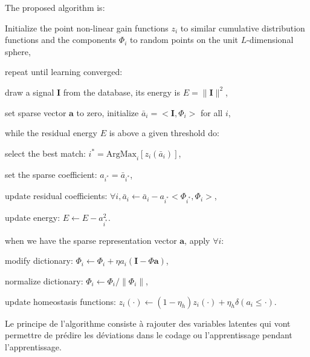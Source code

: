 \documentclass[a4paper, 11pt]{article} %
\newcommand{\coef}{\mathbf{a}} %
\newcommand{\image}{\mathbf{I}} %
\newcommand{\dico}{\Phi} %
\begin{document}
The proposed algorithm is:
\begin{enumerate}%
{\color{MidnightBlue} 
\item Initialize the point non-linear gain functions $z_i$ to similar cumulative distribution functions and the components $\dico_i$ to random points on the unit $L$-dimensional sphere,%
\item repeat until learning converged:%
\begin{enumerate}%
{\color{OliveGreen}
	\item draw a signal $\image$ from the database, its energy is $E = \| \image \|^2$,%
	\item set sparse vector $\coef$ to zero, initialize $\bar{a}_i=<\image, \dico_i >$ for all $i$,%
	\item while the residual energy $E$ is above a given threshold do:
	\begin{enumerate}
		{\color{BrickRed}
			\item select the best match: $i^\ast = \mbox{ArgMax}_{i} [z_i( \bar{a}_i )]$,%
		}
		\item set the sparse coefficient: $a_{i^\ast} = \bar{a}_{i^\ast}$,
		\item update residual coefficients: $\forall i, \bar{a}_i \leftarrow \bar{a}_i - a_{i^\ast} <\dico_{i^\ast} , \dico_i > $,%
		\item update energy: $E \leftarrow E - a_{i^\ast}^2 $.
	\end{enumerate}
}
\item when we have the sparse representation vector $\coef$, apply $\forall i$:
\begin{enumerate}
\item modify dictionary: $\dico_{i} \leftarrow \dico_{i} + \eta a_{i} (\image - \dico\coef)$,%
\item normalize dictionary: $\dico_{i} \leftarrow \dico_{i} / \| \dico_{i}\|$,%
{\color{BrickRed}
\item update homeostasis functions: $z_i( \cdot ) \leftarrow (1- \eta_h ) z_i( \cdot ) + \eta_h \delta( a_i \leq \cdot)$.%
}
\end{enumerate}
\end{enumerate}
}
\end{enumerate}



Le principe de l'algorithme consiste à rajouter des variables latentes
qui vont permettre de prédire les déviations dans le codage ou
l'apprentissage pendant l'apprentissage.
\end{document}
